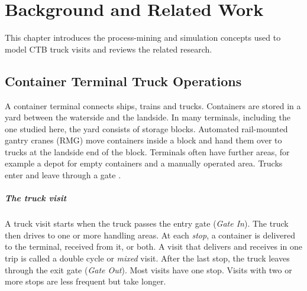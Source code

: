 \chapter{Background and Related Work}
\label{chp:background}


This chapter introduces the process-mining and simulation concepts used to model
CTB truck visits and reviews the related research.

\section{Container Terminal Truck Operations}
\label{sec:bg_terminal}

A container terminal connects ships, trains and trucks. Containers are stored
in a yard between the waterside and the landside. In many terminals, including
the one studied here, the yard consists of storage blocks. Automated
rail-mounted gantry cranes (RMG) move containers inside a block and hand them
over to trucks at the landside end of the block. Terminals often have further
areas, for example a depot for empty containers and a manually operated area.
Trucks enter and leave through a gate \cite{CTSteenken2004}.

\paragraph{The truck visit}
A truck visit starts when the truck passes the entry gate (\emph{Gate In}). The
truck then drives to one or more handling areas. At each \emph{stop}, a
container is delivered to the terminal, received from it, or both. A visit that
delivers and receives in one trip is called a double cycle or \emph{mixed}
visit. After the last stop, the truck leaves through the exit gate (\emph{Gate
Out}). Most visits have one stop. Visits with two or more stops are less
frequent but take longer.

